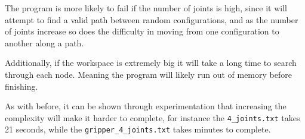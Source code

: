 \documentclass[12pt]{article}
\begin{document}
    The program is more likely to fail if the number of joints is high, since it will attempt to find a valid path between random configurations, and as the number of joints increase so does the difficulty in moving from one configuration to another along a path.

    Additionally, if the workspace is extremely big it will take a long time to search through each node. Meaning the program will likely run out of memory before finishing.

    As with before, it can be shown through experimentation that increasing the complexity will make it harder to complete, for instance the \texttt{4\_joints.txt} takes 21 seconds, while the \texttt{gripper\_4\_joints.txt} takes minutes to complete. 
\end{document}
